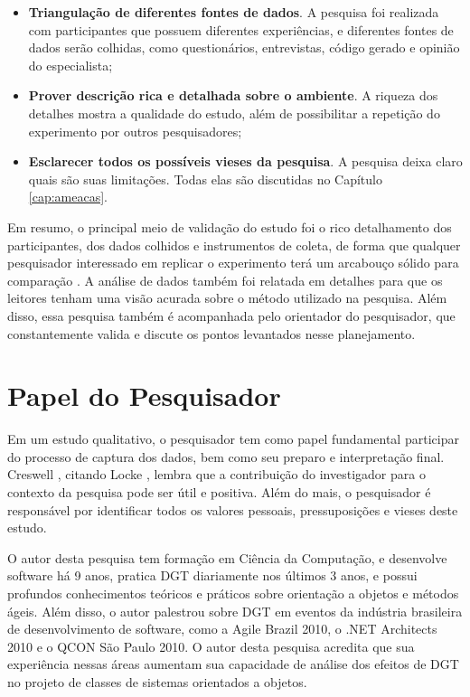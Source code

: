 \begin{itemize}
	\item \textbf{Triangulação de diferentes fontes de dados}. A pesquisa foi
	realizada com participantes que possuem diferentes experiências, e diferentes
	fontes de dados serão colhidas, como questionários, entrevistas, código gerado e 
	opinião do especialista;

	\item \textbf{Prover descrição rica e detalhada sobre o ambiente}. A riqueza
	dos detalhes mostra a qualidade do estudo, além de possibilitar a repetição do
	experimento por outros pesquisadores;

	\item \textbf{Esclarecer todos os possíveis vieses da pesquisa}. A pesquisa
	deixa claro quais são suas limitações. Todas elas são discutidas no Capítulo
	\ref{cap:ameacas}.

\end{itemize}

Em resumo, o principal meio de validação do estudo foi o rico detalhamento dos
participantes, dos dados colhidos e instrumentos de coleta, de forma
que qualquer pesquisador interessado em replicar o experimento terá um
arcabouço sólido para comparação \cite{merriam-1998}. A análise de
dados também foi relatada em detalhes para que os leitores tenham uma visão
acurada sobre o método utilizado na pesquisa. 
Além disso, essa pesquisa também é acompanhada pelo orientador do pesquisador,
que constantemente valida e discute os pontos levantados nesse planejamento.

\section{Papel do Pesquisador}
\label{sec:planejamento-papel}

Em um estudo qualitativo, o pesquisador tem como papel fundamental participar do 
processo de captura dos dados, bem como seu preparo e interpretação final.
Creswell \cite{creswell}, citando Locke \cite{locke}, lembra
que a contribuição do investigador para o contexto da pesquisa pode ser útil e
positiva. Além do mais, o pesquisador é responsável por
identificar todos os valores pessoais, pressuposições e vieses deste estudo.

O autor desta pesquisa tem formação em Ciência da Computação, e desenvolve software há 9
anos, pratica DGT diariamente nos últimos 3 anos, e possui profundos
conhecimentos teóricos e práticos sobre orientação a objetos e métodos ágeis.
Além disso, o autor palestrou sobre DGT em eventos da indústria brasileira
de desenvolvimento de software, como a Agile Brazil 2010, o .NET Architects
2010 e o QCON São Paulo 2010. O autor desta pesquisa acredita que sua experiência nessas
áreas aumentam sua capacidade de análise dos efeitos de DGT no projeto de classes de sistemas 
orientados a objetos.

